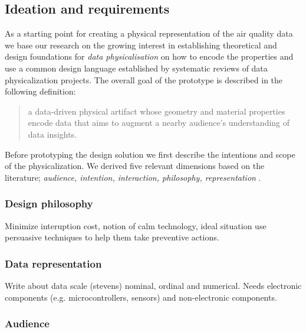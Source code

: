 \subsection{Ideation and requirements}

As a starting point for creating a physical representation of the air quality data we base our research on the growing interest in establishing theoretical and design foundations for \textit{data physicalisation} \cite{hornecker_design_2023, sauve_physecology_2022, bae_making_2022} on how to encode the properties and use a common design language \cite{ranasinghe_encoding_2023, sosa_data_2018} established by systematic reviews of data physicalization projects. The overall goal of the prototype is described in the following definition:

\begin{quote}
a data-driven physical artifact whose geometry and material properties encode data that aims to augment a nearby audience’s understanding of data insights.
\end{quote}

Before prototyping the design solution we first describe the  intentions and scope of the physicalization. We derived five relevant dimensions based on the literature; \textit{audience, intention, interaction, philosophy, representation} \cite{sauve_physecology_2022, hornecker_design_2023}.

\subsubsection{Design philosophy}

Minimize interuption cost, notion of calm technology, ideal situation use persuasive techniques to help them take preventive actions.

\subsubsection{Data representation}

Write about data scale (stevens) nominal, ordinal and numerical. Needs electronic components (e.g. microcontrollers, sensors) and non-electronic components.

\subsubsection{Audience}

